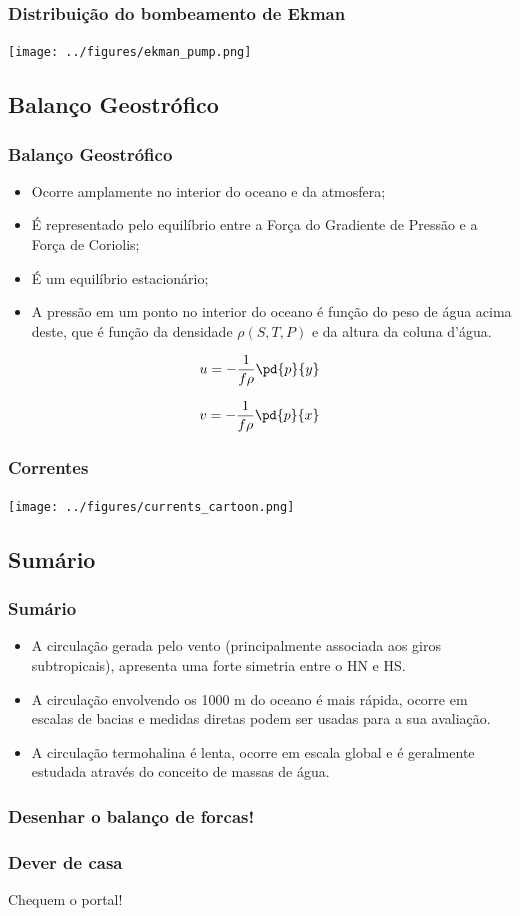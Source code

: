 \begin{frame}
  \frametitle{Distribuição do bombeamento de Ekman}
      \begin{center}
        \texttt{[image: ../figures/ekman\_pump.png]}
      \end{center}
\end{frame}


\subsection{Balanço Geostrófico}
\begin{frame}
  \frametitle{Balanço Geostrófico}
  {\scriptsize
  \begin{itemize}[<+-| alert@+>]
    \item Ocorre amplamente no interior do oceano e da atmosfera;
    \item É representado pelo equilíbrio entre a Força do Gradiente de Pressão
          e a Força de Coriolis;
    \item É um equilíbrio estacionário;
    \item A pressão em um ponto no interior do oceano é função do peso de água
          acima deste, que é função da densidade $\rho(S, T, P)$ e da altura da
          coluna d'água.
  \end{itemize}
  \pause
  \begin{block}{}
    \[
      u = -\frac{1}{f\rho}\pd{p}{y}
    \]

    \[
      v = -\frac{1}{f\rho}\pd{p}{x}
    \]
  \end{block}
}
\end{frame}


\begin{frame}
  \frametitle{Correntes}
  \begin{center}
    \texttt{[image: ../figures/currents\_cartoon.png]}
  \end{center}
\end{frame}

\subsection{Sumário}
\begin{frame}
\frametitle{Sumário}
  \begin{itemize}[<+-| alert@+>]
    \item A circulação gerada pelo vento (principalmente associada aos giros
          subtropicais), apresenta uma forte simetria entre o HN e HS.
    \item A circulação envolvendo os 1000 m do oceano é mais rápida, ocorre em
          escalas de bacias e medidas diretas podem ser usadas para a sua
          avaliação.
    \item A circulação termohalina é lenta, ocorre em escala global e é
          geralmente estudada através do conceito de massas de água.
  \end{itemize}
\end{frame}


\begin{frame}
  \frametitle{Desenhar o balanço de forcas!}
\end{frame}

\begin{frame}
  \frametitle{Dever de casa}
  \pause
    Chequem o portal!
\end{frame}


